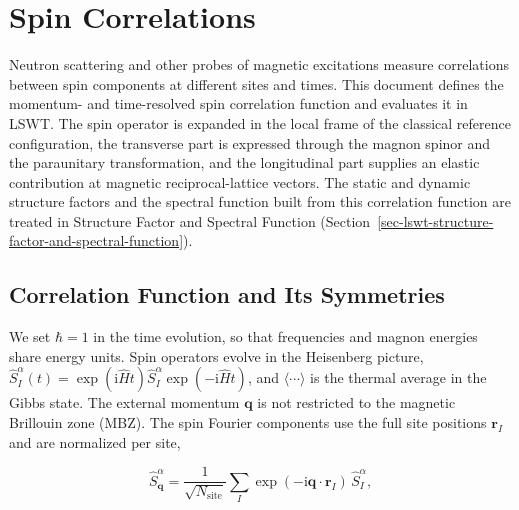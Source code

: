 
\hypertarget{sec-lswt-spin-correlations}{%
\section{Spin Correlations}\label{sec-lswt-spin-correlations}}

Neutron scattering and other probes of magnetic excitations measure correlations between spin components at different sites and times. This document defines the momentum- and time-resolved spin correlation function and evaluates it in LSWT. The spin operator is expanded in the local frame of the classical reference configuration, the transverse part is expressed through the magnon spinor and the paraunitary transformation, and the longitudinal part supplies an elastic contribution at magnetic reciprocal-lattice vectors. The static and dynamic structure factors and the spectral function built from this correlation function are treated in Structure Factor and Spectral Function (Section~\ref{sec-lswt-structure-factor-and-spectral-function}).

\subsection{Correlation Function and Its Symmetries}

We set \(\hbar=1\) in the time evolution, so that frequencies and magnon energies share energy units. Spin operators evolve in the Heisenberg picture, \(\hat S_I^\alpha(t)=\exp(\mathrm i\hat H t)\hat S_I^\alpha\exp(-\mathrm i\hat Ht)\), and \(\langle\cdots\rangle\) is the thermal average in the Gibbs state. The external momentum \(\mathbf q\) is not restricted to the magnetic Brillouin zone (MBZ). The spin Fourier components use the full site positions \(\mathbf r_I\) and are normalized per site,

\begin{equation}\label{eq-lswt-spin-fourier-component}
\hat S_{\mathbf q}^\alpha
=\frac{1}{\sqrt{N_{\mathrm{site}}}}\sum_I\exp(-\mathrm i\mathbf q\cdot\mathbf r_I)\,\hat S_I^\alpha,
\end{equation}

